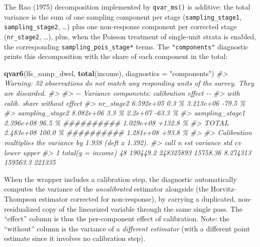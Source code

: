 \documentclass[
]{article}
\newenvironment{Shaded}{\begin{snugshade}}{\end{snugshade}}
\newcommand{\AttributeTok}[1]{\textcolor[rgb]{0.13,0.29,0.53}{#1}}
\newcommand{\CommentTok}[1]{\textcolor[rgb]{0.56,0.35,0.01}{\textit{#1}}}
\newcommand{\FunctionTok}[1]{\textcolor[rgb]{0.13,0.29,0.53}{\textbf{#1}}}
\newcommand{\NormalTok}[1]{#1}
\newcommand{\StringTok}[1]{\textcolor[rgb]{0.31,0.60,0.02}{#1}}
\begin{document}
The Rao (1975) decomposition implemented by \texttt{qvar\_ms()} is
additive: the total variance is the sum of one sampling component per
stage (\texttt{sampling\_stage1}, \texttt{sampling\_stage2}, \ldots)
plus one non-response component per corrected stage
(\texttt{nr\_stage2}, \ldots), plus, when the Poisson treatment of
single-unit strata is enabled, the corresponding
\texttt{sampling\_pois\_stage*} terms. The \texttt{"components"}
diagnostic prints this decomposition with the share of each component in
the total:

\begin{Shaded}
\begin{Highlighting}[]
\FunctionTok{qvar6}\NormalTok{(lfs\_samp\_dwel, }\FunctionTok{total}\NormalTok{(income), }\AttributeTok{diagnostics =} \StringTok{"components"}\NormalTok{)}
\CommentTok{\#\textgreater{} Warning: 32 observations do not match any responding units of the survey. They are discarded.}
\CommentTok{\#\textgreater{} }
\CommentTok{\#\textgreater{} {-}{-} Variance components: calibration effect {-}{-}}
\CommentTok{\#\textgreater{}                       with calib.     share                     without     effect}
\CommentTok{\#\textgreater{}   nr\_stage2             6.592e+05    0.3 \%                   3.213e+06     {-}79.5 \%}
\CommentTok{\#\textgreater{}   sampling\_stage2       8.082e+06    3.3 \%                     2.2e+07     {-}63.3 \%}
\CommentTok{\#\textgreater{}   sampling\_stage1       2.396e+08   96.5 \%  \#\#\#\#\#\#\#\#\#\#       1.029e+08    +132.8 \%}
\CommentTok{\#\textgreater{}   TOTAL                 2.483e+08  100.0 \%  \#\#\#\#\#\#\#\#\#\#       1.281e+08     +93.8 \%}
\CommentTok{\#\textgreater{} }
\CommentTok{\#\textgreater{}   Calibration multiplies the variance by 1.938 (deft x 1.392).}
\CommentTok{\#\textgreater{}                call  n      est  variance      std       cv    lower  upper}
\CommentTok{\#\textgreater{} 1 total(y = income) 48 190449.2 248325893 15758.36 8.274313 159563.3 221335}
\end{Highlighting}
\end{Shaded}

When the wrapper includes a calibration step, the diagnostic
automatically computes the variance of the \emph{uncalibrated} estimator
alongside (the Horvitz-Thompson estimator corrected for non-response),
by carrying a duplicated, non-residualized copy of the linearized
variable through the same single pass. The ``effect'' column is thus the
per-component effect of calibration. Note: the ``without'' column is the
variance of a \emph{different estimator} (with a different point
estimate since it involves no calibration step).
\end{document}
